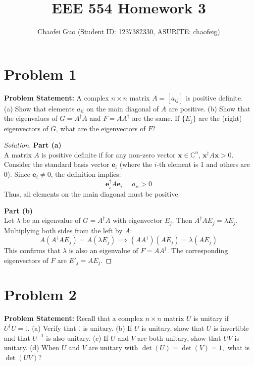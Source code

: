 \documentclass{article}
\title{EEE 554 Homework 3}
\author{Chaofei Guo (Student ID: 1237382330, ASURITE: chaofeig)}
\date{}
\begin{document}
\maketitle

\section*{Problem 1}
\textbf{Problem Statement:}
A complex $n\times n$ matrix $A=[a_{ij}]$ is positive definite.
(a) Show that elements $a_{ii}$ on the main diagonal of $A$ are positive.
(b) Show that the eigenvalues of $G=A^{\dagger}A$ and $F=AA^{\dagger}$ are the same. If $\{E_{j}\}$ are the (right) eigenvectors of $G$, what are the eigenvectors of $F$?

\begin{proof}[Solution]
	\textbf{Part (a)}\\
	A matrix $A$ is positive definite if for any non-zero vector $\mathbf{x} \in \mathbb{C}^n$, $\mathbf{x}^\dagger A \mathbf{x} > 0$. Consider the standard basis vector $\mathbf{e}_i$ (where the $i$-th element is 1 and others are 0). Since $\mathbf{e}_i \neq 0$, the definition implies:
	\[ \mathbf{e}_i^\dagger A \mathbf{e}_i = a_{ii} > 0 \]
	Thus, all elements on the main diagonal must be positive.
	
	\textbf{Part (b)}\\
	Let $\lambda$ be an eigenvalue of $G = A^\dagger A$ with eigenvector $E_j$. Then $A^\dagger A E_j = \lambda E_j$. Multiplying both sides from the left by $A$:
	\[ A(A^\dagger A E_j) = A(\lambda E_j) \implies (AA^\dagger)(A E_j) = \lambda (A E_j) \]
	This confirms that $\lambda$ is also an eigenvalue of $F = AA^\dagger$. The corresponding eigenvectors of $F$ are $E'_j = A E_j$.
\end{proof}

\vspace{1cm}

\section*{Problem 2}
\textbf{Problem Statement:}
Recall that a complex $n\times n$ matrix $U$ is unitary if $U^{\dagger}U=\mathbb{I}$.
(a) Verify that $\mathbb{I}$ is unitary.
(b) If $U$ is unitary, show that $U$ is invertible and that $U^{-1}$ is also unitary.
(c) If $U$ and $V$ are both unitary, show that $UV$ is unitary.
(d) When $U$ and $V$ are unitary with $\det(U)=\det(V)=1,$ what is $\det(UV)$?
\end{document}
